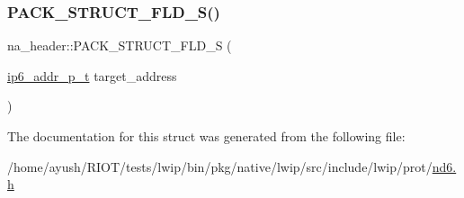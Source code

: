 \mbox{\label{structna__header_ac6055f058c928dca86a74d6035d175cb}} 
\subsubsection{\texorpdfstring{P\+A\+C\+K\+\_\+\+S\+T\+R\+U\+C\+T\+\_\+\+F\+L\+D\+\_\+\+S()}{PACK\_STRUCT\_FLD\_S()}\hspace{0.1cm}{\footnotesize\ttfamily [2/2]}}
{\footnotesize\ttfamily na\+\_\+header\+::\+P\+A\+C\+K\+\_\+\+S\+T\+R\+U\+C\+T\+\_\+\+F\+L\+D\+\_\+S (\begin{DoxyParamCaption}\item[{\hyperlink{native_2lwip_2src_2include_2lwip_2prot_2ip6_8h_a560932a657f17ec5a0a3a78a1ce7e60a}{ip6\+\_\+addr\+\_\+p\+\_\+t}}]{target\+\_\+address }\end{DoxyParamCaption})}



The documentation for this struct was generated from the following file\+:\begin{DoxyCompactItemize}
\item 
/home/ayush/\+R\+I\+O\+T/tests/lwip/bin/pkg/native/lwip/src/include/lwip/prot/\hyperlink{native_2lwip_2src_2include_2lwip_2prot_2nd6_8h}{nd6.\+h}\end{DoxyCompactItemize}
